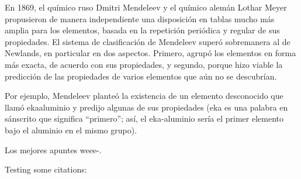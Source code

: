 \documentclass[spanish]{article}
\begin{document}
En 1869, el químico ruso Dmitri Mendeleev y el químico alemán Lothar Meyer propusieron de manera independiente una disposición en tablas mucho más amplia para los elementos, basada en la  repetición periódica y regular de sus propiedades. El sistema de clasificación de Mendeleev superó sobremanera al de Newlands, en particular en dos aspectos. Primero, agrupó los elementos en forma más exacta, de acuerdo con sus propiedades, y segundo, porque hizo viable la predicción de las propiedades de varios elementos que aún no se descubrían.

Por ejemplo, Mendeleev planteó la existencia de un elemento desconocido que llamó ekaaluminio y predijo algunas de sus propiedades (eka es una palabra en sánscrito que significa
“primero”; así, el eka-aluminio sería el primer elemento bajo el aluminio en el mismo grupo).


Los mejores apuntes weee-.



Testing some citations: \cite{Lim2016TEI}




\end{document}
